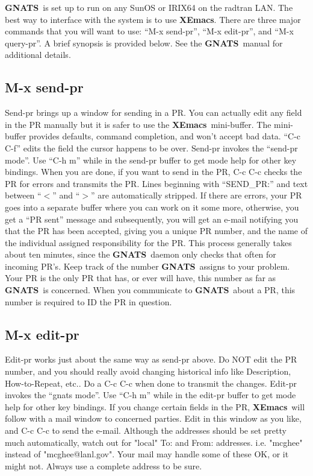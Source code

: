 \documentclass[11pt]{nmemo}
\newcommand{\xemacs}{{\normalfont\bfseries XEmacs}}
\newcommand{\gnats}{{\normalfont\bfseries GNATS}}
\begin{document}
\gnats\ is set up to run on any SunOS or IRIX64 on the radtran LAN.
The best way to interface with the system is to
use \xemacs. 
 There are three major commands that you will want to use:
``M-x send-pr'', ``M-x edit-pr'', and ``M-x query-pr''. A brief synopsis
is provided below. See the \gnats\ manual for additional details.

\subsection{M-x send-pr }
Send-pr brings up a window for sending in a PR. You can actually 
edit any field in the PR manually but it is safer to use the \xemacs\ mini-buffer.
The mini-buffer provides defaults, command completion, and won't accept bad
data. ``C-c C-f'' edits the field the cursor happens to be over.
Send-pr invokes the ``send-pr mode''.
Use ``C-h m'' while in the send-pr buffer to get mode help for 
other key bindings.
When you are done, if
you want to send in the PR, C-c C-c checks the
PR for errors and transmits the PR. Lines beginning with
``SEND\_PR:'' and text between ``$<$'' and ``$>$'' are automatically stripped.
If there are errors, your PR
goes into a separate buffer where you can work on it some more,
otherwise, you get a ``PR sent'' message and subsequently,
you will get an e-mail notifying you that the PR has been accepted,
giving you a unique PR number, and the name of the individual assigned
responsibility for the PR.  This process generally takes about
ten  minutes, since the \gnats\ daemon
only checks that often for incoming PR's.
Keep track of the number \gnats\ assigns to
your problem. Your PR is the only PR that has, or ever will
have, this number as far as \gnats\ is concerned. When you communicate
to \gnats\ about a PR, this number is required to ID the PR in question.

\subsection{M-x edit-pr }
Edit-pr works just about the same way as send-pr above. Do NOT edit
the PR number, and you should really avoid changing historical info
like Description, How-to-Repeat, etc.. Do a C-c C-c when done to
transmit the changes. Edit-pr invokes the ``gnats mode''.
Use ``C-h m'' while in the edit-pr buffer 
to get mode help for other key bindings.
If you change certain fields in the PR, \xemacs\ will follow
with a mail window to concerned parties. Edit in this window as you
like, and C-c C-c to send the e-mail. Although the addresses should
be set pretty much automatically, watch out for "local"  To:
and From: addresses. i.e.
"mcghee" instead of "mcghee@lanl.gov". Your mail may handle some of
these OK, or it might not. Always use a complete address to be sure.
\end{document}
